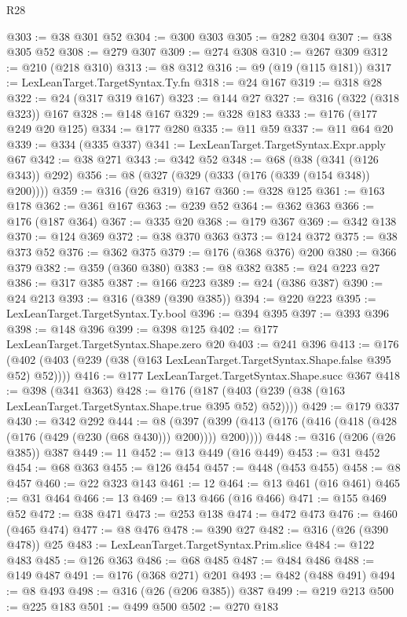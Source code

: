 \begin{lexlean}{R28}
\begin{coremodule}
@303 := @38 @301 @52
@304 := @300 @303
@305 := @282 @304
@307 := @38 @305 @52
@308 := @279 @307
@309 := @274 @308
@310 := @267 @309
@312 := @210 (@218 @310)
@313 := @8 @312
@316 := @9 (@19 (@115 @181))
@317 := LexLeanTarget.TargetSyntax.Ty.fn
@318 := @24 @167
@319 := @318 @28
@322 := @24 (@317 @319 @167)
@323 := @144 @27
@327 := @316 (@322 (@318 @323)) @167
@328 := @148 @167
@329 := @328 @183
@333 := @176 (@177 @249 @20 @125)
@334 := @177 @280
@335 := @11 @59
@337 := @11 @64 @20
@339 := @334 (@335 @337)
@341 := LexLeanTarget.TargetSyntax.Expr.apply @67
@342 := @38 @271
@343 := @342 @52
@348 := @68 (@38 (@341 (@126 @343)) @292)
@356 := @8 (@327 (@329 (@333 (@176 (@339 (@154 @348)) @200))))
@359 := @316 (@26 @319) @167
@360 := @328 @125
@361 := @163 @178
@362 := @361 @167
@363 := @239 @52
@364 := @362 @363
@366 := @176 (@187 @364)
@367 := @335 @20
@368 := @179 @367
@369 := @342 @138
@370 := @124 @369
@372 := @38 @370 @363
@373 := @124 @372
@375 := @38 @373 @52
@376 := @362 @375
@379 := @176 (@368 @376) @200
@380 := @366 @379
@382 := @359 (@360 @380)
@383 := @8 @382
@385 := @24 @223 @27
@386 := @317 @385
@387 := @166 @223
@389 := @24 (@386 @387)
@390 := @24 @213
@393 := @316 (@389 (@390 @385))
@394 := @220 @223
@395 := LexLeanTarget.TargetSyntax.Ty.bool
@396 := @394 @395
@397 := @393 @396
@398 := @148 @396
@399 := @398 @125
@402 := @177 LexLeanTarget.TargetSyntax.Shape.zero @20
@403 := @241 @396
@413 := @176 (@402 (@403 (@239 (@38 (@163 LexLeanTarget.TargetSyntax.Shape.false @395 @52) @52))))
@416 := @177 LexLeanTarget.TargetSyntax.Shape.succ @367
@418 := @398 (@341 @363)
@428 := @176 (@187 (@403 (@239 (@38 (@163 LexLeanTarget.TargetSyntax.Shape.true @395 @52) @52))))
@429 := @179 @337
@430 := @342 @292
@444 := @8
    (@397 (@399 (@413 (@176 (@416 (@418 (@428 (@176 (@429 (@230 (@68 @430))) @200)))) @200))))
@448 := @316 (@206 (@26 @385)) @387
@449 := 11
@452 := @13 @449 (@16 @449)
@453 := @31 @452
@454 := @68 @363
@455 := @126 @454
@457 := @448 (@453 @455)
@458 := @8 @457
@460 := @22 @323 @143
@461 := 12
@464 := @13 @461 (@16 @461)
@465 := @31 @464
@466 := 13
@469 := @13 @466 (@16 @466)
@471 := @155 @469 @52
@472 := @38 @471
@473 := @253 @138
@474 := @472 @473
@476 := @460 (@465 @474)
@477 := @8 @476
@478 := @390 @27
@482 := @316 (@26 (@390 @478)) @25
@483 := LexLeanTarget.TargetSyntax.Prim.slice
@484 := @122 @483
@485 := @126 @363
@486 := @68 @485
@487 := @484 @486
@488 := @149 @487
@491 := @176 (@368 @271) @201
@493 := @482 (@488 @491)
@494 := @8 @493
@498 := @316 (@26 (@206 @385)) @387
@499 := @219 @213
@500 := @225 @183
@501 := @499 @500
@502 := @270 @183

\end{coremodule}
\end{lexlean}
